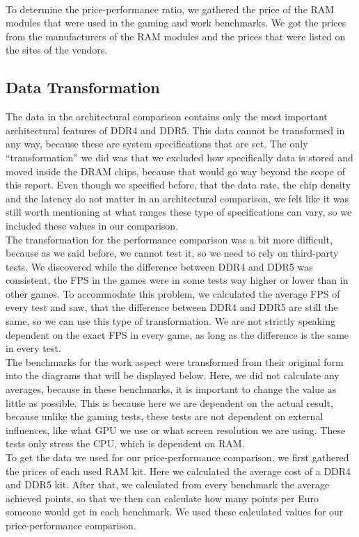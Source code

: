\\
To determine the price-performance ratio, we gathered the price of the RAM modules that were used in the gaming and work benchmarks. We got the prices from the manufacturers of the RAM modules and the prices that were listed on the sites of the vendors. 

\subsection{Data Transformation}

The data in the architectural comparison contains only the most important architectural features of DDR4 and DDR5. This data cannot be transformed in any way, because these are system specifications that are set. The only “transformation” we did was that we excluded how specifically data is stored and moved inside the DRAM chips, because that would go way beyond the scope of this report. Even though we specified before, that the data rate, the chip density and the latency do not matter in an architectural comparison, we felt like it was still worth mentioning at what ranges these type of specifications can vary, so we included these values in our comparison.
\\
The transformation for the performance comparison was a bit more difficult, because as we said before, we cannot test it, so we need to rely on third-party tests. We discovered while the difference between DDR4 and DDR5 was consistent, the FPS in the games were in some tests way higher or lower than in other games. To accommodate this problem, we calculated the average FPS of every test and saw, that the difference between DDR4 and DDR5 are still the same, so we can use this type of transformation. We are not strictly speaking dependent on the exact FPS in every game, as long as the difference is the same in every test.
\\
The benchmarks for the work aspect were transformed from their original form into the diagrams that will be displayed below. Here, we did not calculate any averages, because in these benchmarks, it is important to change the value as little as possible. This is because here we are dependent on the actual result, because unlike the gaming tests, these tests are not dependent on external influences, like what \gls{GPU} we use or what screen resolution we are using. These tests only stress the CPU, which is dependent on RAM.
\\
To get the data we used for our price-performance comparison, we first gathered the prices of each used RAM kit. Here we calculated the average cost of a DDR4 and DDR5 kit. After that, we calculated from every benchmark the average achieved points, so that we then can calculate how many points per Euro someone would get in each benchmark. We used these calculated values for our price-performance comparison.

